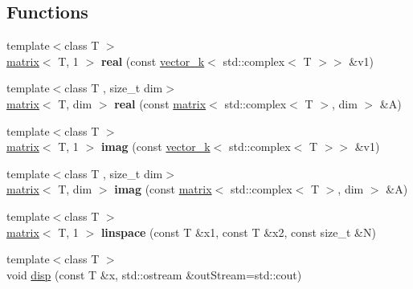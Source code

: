 \subsection*{Functions}
\begin{DoxyCompactItemize}
\item 
\hypertarget{namespacekeycpp_ae84fcdbb1d5010c9e67a02851edd4460}{{\footnotesize template$<$class T $>$ }\\\hyperlink{classkeycpp_1_1matrix}{matrix}$<$ T, 1 $>$ {\bfseries real} (const \hyperlink{classkeycpp_1_1vector__k}{vector\-\_\-k}$<$ std\-::complex$<$ T $>$$>$ \&v1)}\label{namespacekeycpp_ae84fcdbb1d5010c9e67a02851edd4460}

\item 
\hypertarget{namespacekeycpp_a6ab8937a6378526f7514c6124fb9991a}{{\footnotesize template$<$class T , size\-\_\-t dim$>$ }\\\hyperlink{classkeycpp_1_1matrix}{matrix}$<$ T, dim $>$ {\bfseries real} (const \hyperlink{classkeycpp_1_1matrix}{matrix}$<$ std\-::complex$<$ T $>$, dim $>$ \&A)}\label{namespacekeycpp_a6ab8937a6378526f7514c6124fb9991a}

\item 
\hypertarget{namespacekeycpp_ac70fdb60acaa9b85c49cdd36ac68a6ae}{{\footnotesize template$<$class T $>$ }\\\hyperlink{classkeycpp_1_1matrix}{matrix}$<$ T, 1 $>$ {\bfseries imag} (const \hyperlink{classkeycpp_1_1vector__k}{vector\-\_\-k}$<$ std\-::complex$<$ T $>$$>$ \&v1)}\label{namespacekeycpp_ac70fdb60acaa9b85c49cdd36ac68a6ae}

\item 
\hypertarget{namespacekeycpp_a026d42394a53ae81f292d1e3de4383cb}{{\footnotesize template$<$class T , size\-\_\-t dim$>$ }\\\hyperlink{classkeycpp_1_1matrix}{matrix}$<$ T, dim $>$ {\bfseries imag} (const \hyperlink{classkeycpp_1_1matrix}{matrix}$<$ std\-::complex$<$ T $>$, dim $>$ \&A)}\label{namespacekeycpp_a026d42394a53ae81f292d1e3de4383cb}

\item 
\hypertarget{namespacekeycpp_a596aa3ce9318961af77f3a286854f8d4}{{\footnotesize template$<$class T $>$ }\\\hyperlink{classkeycpp_1_1matrix}{matrix}$<$ T, 1 $>$ {\bfseries linspace} (const T \&x1, const T \&x2, const size\-\_\-t \&N)}\label{namespacekeycpp_a596aa3ce9318961af77f3a286854f8d4}

\item 
\hypertarget{namespacekeycpp_af4a2245da139cf6cf2e03426476b3b88}{{\footnotesize template$<$class T $>$ }\\void \hyperlink{namespacekeycpp_af4a2245da139cf6cf2e03426476b3b88}{disp} (const T \&x, std\-::ostream \&out\-Stream=std\-::cout)}\label{namespacekeycpp_af4a2245da139cf6cf2e03426476b3b88}


\end{DoxyCompactItemize}
